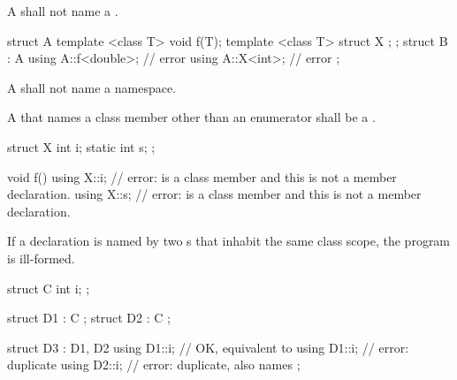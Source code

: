 \pnum
A  shall not name a .
\begin{example}
\begin{codeblock}
struct A {
  template <class T> void f(T);
  template <class T> struct X { };
};
struct B : A {
  using A::f<double>;           // error
  using A::X<int>;              // error
};
\end{codeblock}
\end{example}

\pnum
A  shall not name a namespace.

\pnum
A  that names a class member
other than an enumerator
shall be a
.
\begin{example}
\begin{codeblock}
struct X {
  int i;
  static int s;
};

void f() {
  using X::i;                   // error:  is a class member and this is not a member declaration.
  using X::s;                   // error:  is a class member and this is not a member declaration.
}
\end{codeblock}
\end{example}

\pnum
If a declaration is named by two s
that inhabit the same class scope, the program is ill-formed.
\begin{example}
\begin{codeblock}
struct C {
  int i;
};

struct D1 : C { };
struct D2 : C { };

struct D3 : D1, D2 {
  using D1::i;                  // OK, equivalent to 
  using D1::i;                  // error: duplicate
  using D2::i;                  // error: duplicate, also names 
};
\end{codeblock}
\end{example}

